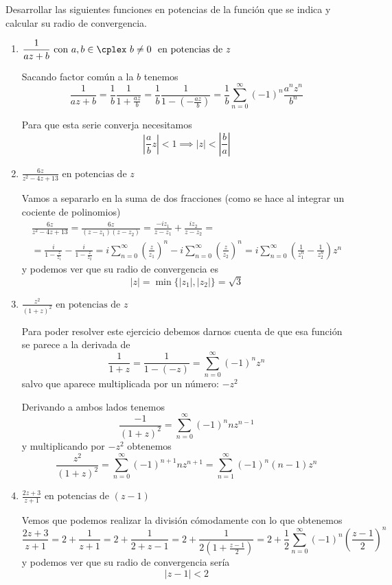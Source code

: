 \documentclass{apuntes}
\begin{document}
\begin{example}
Desarrollar las siguientes funciones en potencias de la función que se indica y calcular su radio de convergencia.
\begin{enumerate}
\item $\displaystyle \frac{1}{az+b} \text{ con } a,b \in \cplex \ b \neq 0 \ \text{ en potencias de } z$

Sacando factor común a la $b$ tenemos
\[\frac{1}{az+b} =  \frac{1}{b} \frac{1}{1+\frac{az}{b}} = \frac{1}{b}\frac{1}{1-\left(-\frac{az}{b}\right)} = \frac{1}{b}\sum_{n=0}^{\infty}(-1)^n\frac{a^nz^n}{b^n}\]

Para que esta serie converja necesitamos
\[\left| \frac{a}{b}z\right| < 1 \implies |z| < \left| \frac{b}{a} \right|\]

\item $\displaystyle \frac{6z}{z^2-4z+13} \text{ en potencias de } z$

Vamos a separarlo en la suma de dos fracciones (como se hace al integrar un cociente de polinomios)
\begin{gather*}\frac{6z}{z^2-4z+13} = \frac{6z}{(z-z_1)(z-z_2)} = \frac{-iz_1}{z-z_1} + \frac{iz_2}{z-z_2} = \\
= \frac{i}{1-\frac{z}{z_1}} - \frac{i}{1-\frac{z}{z_2}} = i\sum_{n=0}^{\infty}\left(\frac{z}{z_1}\right)^n - i\sum_{n=0}^{\infty}\left(\frac{z}{z_2}\right)^n = i\sum_{n=0}^{\infty}\left( \frac{1}{z_1^n}-\frac{1}{z_2^n}\right)z^n\end{gather*}
y podemos ver que su radio de convergencia es
\[|z| = \min \{|z_1|, |z_2|\}= \sqrt{3}\]

\item $\displaystyle \frac{z^2}{(1+z)^2} \text{ en potencias de } z$

Para poder resolver este ejercicio debemos darnos cuenta de que esa función se parece a la derivada de
\[\frac{1}{1+z} = \frac{1}{1-(-z)} =  \sum_{n=0}^{\infty}(-1)^n z^n\]
salvo que aparece multiplicada por un número: $-z^2$

Derivando a ambos lados tenemos
\[\frac{-1}{(1+z)^2}=\sum_{n=0}^{\infty}(-1)^nnz^{n-1}\]
y multiplicando por $-z^2$ obtenemos
\[\frac{z^2}{(1+z)^2} = \sum_{n=0}^{\infty}(-1)^{n+1}nz^{n+1} = \sum_{n=1}^{\infty}(-1)^n(n-1)z^{n}\]

\item $\displaystyle \frac{2z+3}{z+1} \text{ en potencias de } (z-1)$

Vemos que podemos realizar la división cómodamente con lo que obtenemos
\[\frac{2z+3}{z+1}=2+\frac{1}{z+1} = 2 + \frac{1}{2+z-1} = 2 + \frac{1}{2\left( 1+\frac{z-1}{2}\right)} = 2+\frac{1}{2}\sum_{n=0}^{\infty}(-1)^n\left(\frac{z-1}{2} \right)^n\]
y podemos ver que su radio de convergencia sería
\[|z-1| < 2\]

\end{enumerate}
\end{example}
\end{document}
